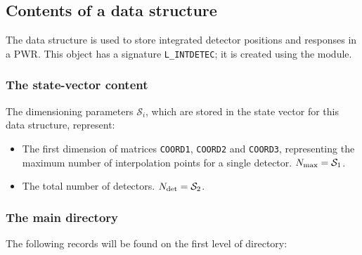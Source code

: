 \subsection{Contents of a  data structure}\label{sect:intdetecdir}

\vskip 0.2cm
The  data structure is used to store integrated detector positions and 
responses in a PWR. This object has a signature {\tt L\_INTDETEC}; it is created using
the  module.

\subsubsection{The state-vector content}\label{sect:devicestate}
\noindent
The dimensioning parameters $\mathcal{S}_i$, which are stored in the state
vector for this data structure, represent:

\begin{itemize}

\item  The first dimension of matrices {\tt COORD1}, {\tt COORD2} and {\tt COORD3}, representing
the maximum number of interpolation points for a single detector. $N_{\rm max} = \mathcal{S}_1$.

\item  The total number of detectors. $N_{\rm det} = \mathcal{S}_2$. 

\end{itemize}

\subsubsection{The main  directory}\label{sect:intdetecdir}
\noindent
The following records will be found on the first level of  directory:

